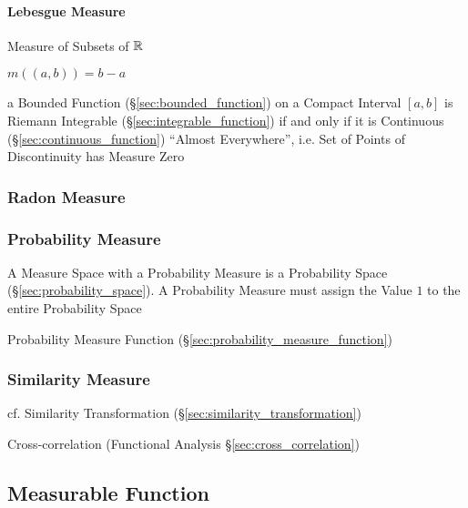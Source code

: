 \paragraph{Lebesgue Measure}\label{sec:lebesgue_measure}\hfill

Measure of Subsets of $\mathbb{R}$

$m((a,b)) = b - a$

a Bounded Function (\S\ref{sec:bounded_function}) on a Compact Interval $[a,b]$
is Riemann Integrable (\S\ref{sec:integrable_function}) if and only if it is
Continuous (\S\ref{sec:continuous_function}) ``Almost Everywhere'', i.e. Set of
Points of Discontinuity has Measure Zero



\subsubsection{Radon Measure}\label{sec:radon_measure}

\subsubsection{Probability Measure}\label{sec:probability_measure}

A Measure Space with a Probability Measure is a Probability Space
(\S\ref{sec:probability_space}). A Probability Measure must assign the Value
$1$ to the entire Probability Space

Probability Measure Function
(\S\ref{sec:probability_measure_function})



\subsubsection{Similarity Measure}\label{sec:similarity_measure}

\fist cf. Similarity Transformation (\S\ref{sec:similarity_transformation})

Cross-correlation (Functional Analysis \S\ref{sec:cross_correlation})



\subsection{Measurable Function}\label{sec:measurable_function}

